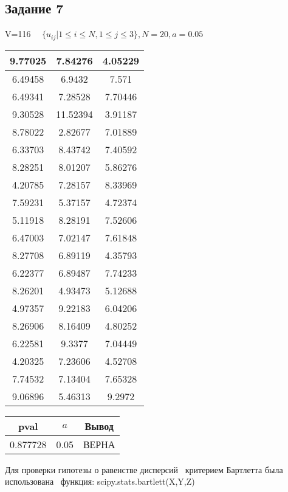 \subsection{Задание 7}%
\label{subsec:7}%
%
V=116%
$\quad \{ u_{ij}|1 \le i \le N, 1\le j \le 3 \}, N=20, a =0.05 $

%
\begin{changemargin}{0cm}{0cm}\small{%
\center%
\begin{tabular}{|c|c|c|}%
\hline%
9.77025&7.84276&4.05229\\%
\hline%
6.49458&6.9432&7.571\\%
\hline%
6.49341&7.28528&7.70446\\%
\hline%
9.30528&11.52394&3.91187\\%
\hline%
8.78022&2.82677&7.01889\\%
\hline%
6.33703&8.43742&7.40592\\%
\hline%
8.28251&8.01207&5.86276\\%
\hline%
4.20785&7.28157&8.33969\\%
\hline%
7.59231&5.37157&4.72374\\%
\hline%
5.11918&8.28191&7.52606\\%
\hline%
6.47003&7.02147&7.61848\\%
\hline%
8.27708&6.89119&4.35793\\%
\hline%
6.22377&6.89487&7.74233\\%
\hline%
8.26201&4.93473&5.12688\\%
\hline%
4.97357&9.22183&6.04206\\%
\hline%
8.26906&8.16409&4.80252\\%
\hline%
6.22581&9.3377&7.04449\\%
\hline%
4.20325&7.23606&4.52708\\%
\hline%
7.74532&7.13404&7.65328\\%
\hline%
9.06896&5.46313&9.2972\\%
\hline%
\end{tabular}%
\newline%
\newline%
%
}\end{changemargin}%
\begin{changemargin}{-0cm}{0cm}\small{%
\center%
\begin{tabular}{|c|c|c|}%
\hline%
pval&$a$&Вывод\\%
\hline%
0.877728&0.05&ВЕРНА\\%
\hline%
\end{tabular}%
\newline%
\newline%
%
}\end{changemargin}%
Для проверки гипотезы о равенстве дисперсий \
            критерием Бартлетта была использована \
            функция: scipy.stats.bartlett(X,Y,Z)